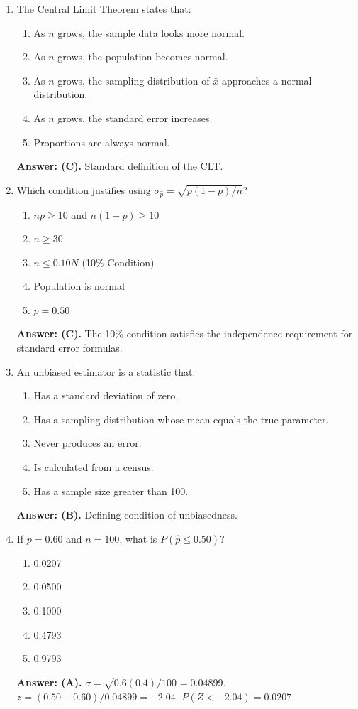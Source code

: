 \begin{enumerate}[leftmargin=1.5em]
  \item The Central Limit Theorem states that:
  \begin{enumerate}[label=(\Alph*)]
    \item As $n$ grows, the sample data looks more normal.
    \item As $n$ grows, the population becomes normal.
    \item As $n$ grows, the sampling distribution of $\bar{x}$ approaches a normal distribution.
    \item As $n$ grows, the standard error increases.
    \item Proportions are always normal.
  \end{enumerate}
  \textbf{Answer: (C).} Standard definition of the CLT.

  \item Which condition justifies using $\sigma_{\hat{p}} = \sqrt{p(1-p)/n}$?
  \begin{enumerate}[label=(\Alph*)]
    \item $np \ge 10$ and $n(1-p) \ge 10$ \item $n \ge 30$ \item $n \le 0.10N$ (10\% Condition) \item Population is normal \item $p = 0.50$
  \end{enumerate}
  \textbf{Answer: (C).} The 10\% condition satisfies the independence requirement for standard error formulas.

  \item An unbiased estimator is a statistic that:
  \begin{enumerate}[label=(\Alph*)]
    \item Has a standard deviation of zero.
    \item Has a sampling distribution whose mean equals the true parameter.
    \item Never produces an error.
    \item Is calculated from a census.
    \item Has a sample size greater than 100.
  \end{enumerate}
  \textbf{Answer: (B).} Defining condition of unbiasedness.

  \item If $p = 0.60$ and $n = 100$, what is $P(\hat{p} \le 0.50)$?
  \begin{enumerate}[label=(\Alph*)]
    \item 0.0207 \item 0.0500 \item 0.1000 \item 0.4793 \item 0.9793
  \end{enumerate}
  \textbf{Answer: (A).} $\sigma = \sqrt{0.6(0.4)/100} = 0.04899$. $z = (0.50 - 0.60)/0.04899 = -2.04$. $P(Z < -2.04) = 0.0207$.


\end{enumerate}
